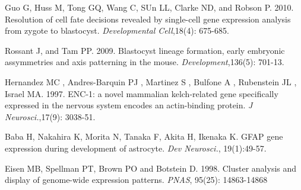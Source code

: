 \documentclass[10pt,letterpaper]{article}
\begin{document}
\clearpage

\begin{thebibliography}{9}

%



%

Guo G, Huss M, Tong GQ, Wang C, SUn LL, Clarke ND, and Robson P. 2010.
Resolution of cell fate decisions revealed by single-cell gene expression analysis from zygote to blastocyst.
\textit{Developmental Cell},18(4): 675-685.

Rossant J, and Tam PP. 2009.
Blastocyst lineage formation, early embryonic assymmetries and axis patterning in the mouse.
\textit{Development},136(5): 701-13.

Hernandez MC , Andres-Barquin PJ , Martinez S , Bulfone A , Rubenstein JL , Israel MA. 1997.
ENC-1: a novel mammalian kelch-related gene specifically expressed in the nervous system encodes an actin-binding protein.
\textit{J Neurosci.},17(9): 3038-51.

Baba H, Nakahira K, Morita N, Tanaka F, Akita H, Ikenaka K.
GFAP gene expression during development of astrocyte.
\textit{Dev Neurosci.}, 19(1):49-57.

Eisen MB, Spellman PT, Brown PO and Botstein D. 1998.
Cluster analysis and display of genome-wide expression patterns.
\textit{PNAS}, 95(25): 14863-14868


\end{thebibliography}
\end{document}
